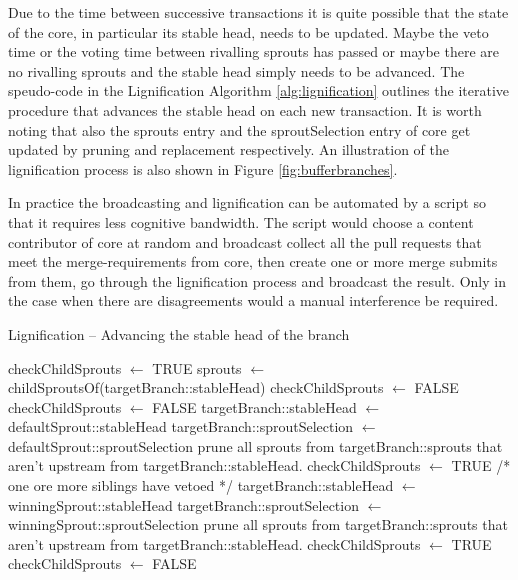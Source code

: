 \documentclass[14pt]{article}
\begin{document}
Due to the time between successive transactions it is quite possible that the state of the core, in particular its stable head, needs to be updated. Maybe the veto time or the voting time between rivalling sprouts has passed or maybe there are no rivalling sprouts and the stable head simply needs to be advanced. The speudo-code in the Lignification Algorithm \ref{alg:lignification} outlines the iterative procedure that advances the stable head on each new transaction. It is worth noting that also the sprouts entry and the sproutSelection entry of core get updated by pruning and replacement respectively.
An illustration of the lignification process is also shown in Figure \ref{fig:bufferbranches}.

In practice the broadcasting and lignification can be automated by a script so that it requires less cognitive bandwidth. The script would choose a content contributor of core at random and broadcast collect all the pull requests that meet the merge-requirements from core, then create one or more merge submits from them, go through the lignification process and broadcast the result. Only in the case when there are disagreements would a manual interference be required.

\begin{algorithm}[h!]
\caption{Lignification -- Advancing the stable head of the branch}
\begin{algorithmic} 
\STATE checkChildSprouts $\leftarrow$ TRUE
\STATE sprouts $\leftarrow$ childSproutsOf(targetBranch::stableHead)
\STATE checkChildSprouts $\leftarrow$ FALSE
\ELSE
{}
\STATE checkChildSprouts $\leftarrow$ FALSE
\ELSE
{}
\STATE targetBranch::stableHead $\leftarrow$ defaultSprout::stableHead
\STATE targetBranch::sproutSelection $\leftarrow$ defaultSprout::sproutSelection
\STATE prune all sprouts from targetBranch::sprouts that aren't upstream from targetBranch::stableHead.
\STATE checkChildSprouts $\leftarrow$ TRUE
\ELSE
\STATE /* one ore more siblings have vetoed */
\STATE targetBranch::stableHead $\leftarrow$ winningSprout::stableHead
\STATE targetBranch::sproutSelection $\leftarrow$ winningSprout::sproutSelection
\STATE prune all sprouts from targetBranch::sprouts that aren't upstream from targetBranch::stableHead.
\STATE checkChildSprouts $\leftarrow$ TRUE
\ELSE
\STATE checkChildSprouts $\leftarrow$ FALSE
\ENDIF
\ENDIF
\ENDIF
\ENDIF
\ENDWHILE
\RETURN
\end{algorithmic}

\label{alg:lignification}
\end{algorithm}
\end{document}
